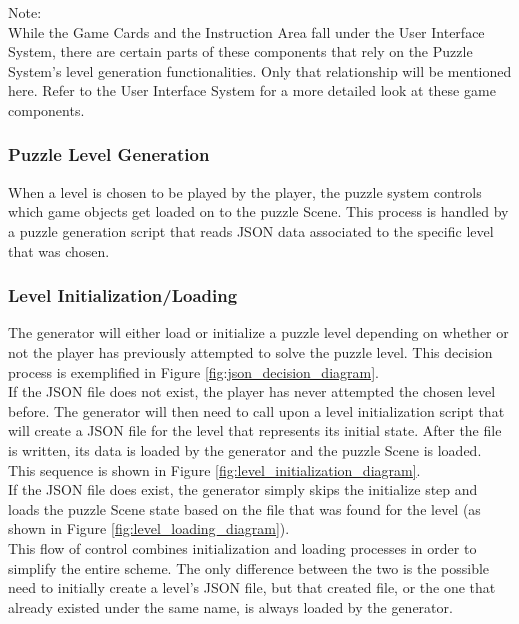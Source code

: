 Note:\\

While the Game Cards and the Instruction Area fall under the User
Interface System, there are certain parts of these components that rely on
the Puzzle System’s level generation functionalities. Only that relationship
will be mentioned here. Refer to the User Interface System for a more detailed
look at these game components.

\subsubsection{Puzzle Level Generation}
When a level is chosen to be played by the player, the puzzle system controls
which game objects get loaded on to the puzzle Scene. This process is handled
by a puzzle generation script that reads JSON data associated to the specific
level that was chosen.

\subsubsection{Level Initialization/Loading}
The generator will either load or initialize a puzzle level depending on whether
or not the player has previously attempted to solve the puzzle level. This
decision process is exemplified in Figure \ref{fig:json_decision_diagram}.\\

If the JSON file does not exist, the player has never attempted the chosen level before. The
generator will then need to call upon a level initialization script that will
create a JSON file for the level that represents its initial state. After the file
is written, its data is loaded by the generator and the puzzle Scene is loaded.
This sequence is shown in Figure \ref{fig:level_initialization_diagram}.\\

If the JSON file does exist, the generator simply skips the initialize step and
loads the puzzle Scene state based on the file that was found for the level (as
shown in Figure \ref{fig:level_loading_diagram}).\\

This flow of control combines initialization and loading processes in order to simplify
the entire scheme. The only difference between the two is the possible need to
initially create a level's JSON file, but that created file, or the one that already
existed under the same name, is always loaded by the generator.\\


